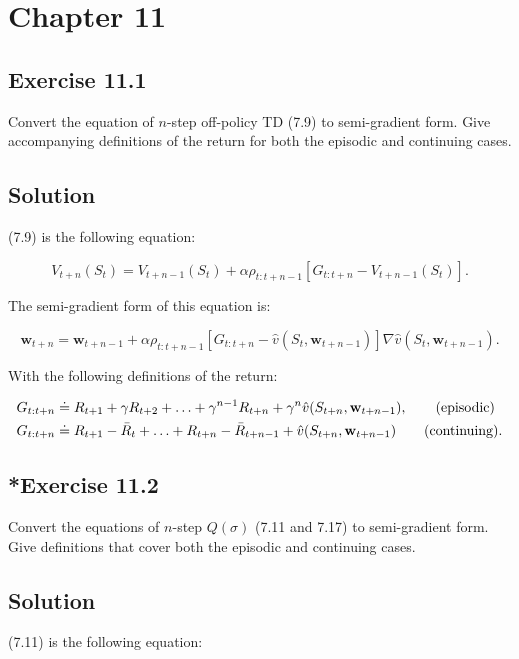 \section*{Chapter 11}

\subsection*{Exercise 11.1}

Convert the equation of $n$-step off-policy TD (7.9) to semi-gradient form.
Give accompanying definitions of the return for both the episodic and continuing cases.

\subsection*{Solution}

(7.9) is the following equation:

\[
    V_{t+n}(S_t) = V_{t+n-1}(S_t) + \alpha \rho_{t:t+n-1} [G_{t:t+n} - V_{t+n-1}(S_t)].
\]

The semi-gradient form of this equation is:

\[
    \mathbf{w}_{t+n} = \mathbf{w}_{t+n-1} + \alpha \rho_{t:t+n-1} \left[G_{t:t+n} - \hat{v}(S_t,\mathbf{w}_{t+n-1}) \right] \nabla \hat{v}(S_t,\mathbf{w}_{t+n-1}).
\]

With the following definitions of the return:

\begin{align*}
    G_{t:t+n} &\doteq R_{t+1} + \gamma R_{t+2} + \ldots + \gamma^{n-1} R_{t+n} + \gamma^n \hat{v}(S_{t+n},\mathbf{w}_{t+n-1}), \text{\qquad (episodic)}\\
    G_{t:t+n} &\doteq R_{t+1} - \bar{R}_{t} + \ldots +  R_{t+n} - \bar{R}_{t+n-1}  +  \hat{v}(S_{t+n},\mathbf{w}_{t+n-1}) \text{\qquad (continuing).}
\end{align*}


\subsection*{*Exercise 11.2}

Convert the equations of $n$-step $Q(\sigma)$ (7.11 and 7.17) to semi-gradient
form. Give definitions that cover both the episodic and continuing cases. 

\subsection*{Solution}
(7.11) is the following equation:

